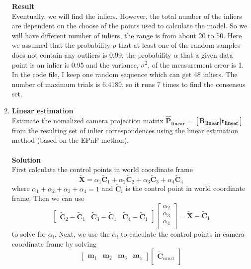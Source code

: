 \documentclass{../../assignment}
\begin{document}
\begin{problemlist}
\begin{enumerate}
\textbf{Result}\\
Eventually, we will find the inliers. However, the total number of the inliers are dependent on the choose of the points used to calculate the model. So we will have different number of inliers, the range is from about 20 to 50. Here we assumed that the probability $p$ that at least one of the random samples does not contain any outliers is 0.99, the probability $\alpha$ that a given data point is an inlier is 0.95 and the variance, $\sigma^2$, of the measurement error is 1. In the code file, I keep one random sequence which can get 48 inliers. The number of maximum trials is 6.4189, so it runs 7 times to find the consensus set.

\item {\bfseries Linear estimation}\\
Estimate the nomalized camera projection matrix $\mathbf{\hat{P}_{linear} = [R_{linear}|t_{linear}]}$ from the resulting set of inlier correspondences using the linear estimation method (based on the EPnP methon).
\\\\
\textbf{Solution}\\
First calculate the control points in world coordinate frame
$$\mathbf{\widetilde{X}} = \alpha_1\mathbf{\widetilde{C}}_1 + \alpha_2\mathbf{\widetilde{C}}_2 + \alpha_3\mathbf{\widetilde{C}}_3 + \alpha_4\mathbf{\widetilde{C}}_4$$
where $\alpha_1 + \alpha_2 + \alpha_3 + \alpha_4 = 1$ and $\mathbf{\widetilde{C}}_i$ is the control point in world coordinate frame. Then we can use
\[
\begin{bmatrix}
\mathbf{\widetilde{C}}_2 - \mathbf{\widetilde{C}}_1 & \mathbf{\widetilde{C}}_3 - \mathbf{\widetilde{C}}_1 & \mathbf{\widetilde{C}}_4 - \mathbf{\widetilde{C}}_1
\end{bmatrix}
\begin{bmatrix}
\alpha_2\\
\alpha_3\\
\alpha_4\\
\end{bmatrix}
= \mathbf{\widetilde{X}} - \mathbf{\widetilde{C}}_1
\]
to solve for $\alpha_i$.
Next, we use the $\alpha_i$ to calculate the control points in camera coordinate frame by solving
\[
\begin{bmatrix}
\mathbf{m}_1 & \mathbf{m}_2 & \mathbf{m}_3 & \mathbf{m}_4
\end{bmatrix}
\begin{bmatrix}
\mathbf{\widetilde{C}}_{cam1}\\

\end{bmatrix}\]
\end{enumerate}
\end{problemlist}
\end{document}
